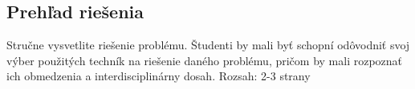 \subsection{Prehľad riešenia}
Stručne vysvetlite riešenie problému. Študenti by mali byť schopní odôvodniť svoj výber použitých techník na riešenie daného problému, pričom by mali rozpoznať ich obmedzenia a interdisciplinárny dosah. Rozsah: 2-3 strany
